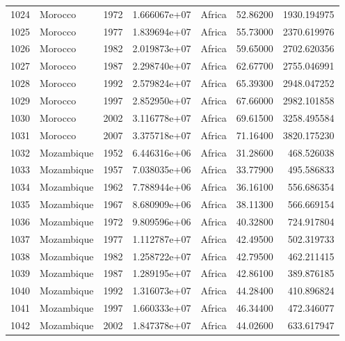 \documentclass[
  letterpaper,
  DIV=11,
  numbers=noendperiod]{scrreprt}
\begin{document}
\begin{tabular}{llrrlrr}
1024 &                   Morocco &  1972 &  1.666067e+07 &    Africa &  52.86200 &    1930.194975 \\
1025 &                   Morocco &  1977 &  1.839694e+07 &    Africa &  55.73000 &    2370.619976 \\
1026 &                   Morocco &  1982 &  2.019873e+07 &    Africa &  59.65000 &    2702.620356 \\
1027 &                   Morocco &  1987 &  2.298740e+07 &    Africa &  62.67700 &    2755.046991 \\
1028 &                   Morocco &  1992 &  2.579824e+07 &    Africa &  65.39300 &    2948.047252 \\
1029 &                   Morocco &  1997 &  2.852950e+07 &    Africa &  67.66000 &    2982.101858 \\
1030 &                   Morocco &  2002 &  3.116778e+07 &    Africa &  69.61500 &    3258.495584 \\
1031 &                   Morocco &  2007 &  3.375718e+07 &    Africa &  71.16400 &    3820.175230 \\
1032 &                Mozambique &  1952 &  6.446316e+06 &    Africa &  31.28600 &     468.526038 \\
1033 &                Mozambique &  1957 &  7.038035e+06 &    Africa &  33.77900 &     495.586833 \\
1034 &                Mozambique &  1962 &  7.788944e+06 &    Africa &  36.16100 &     556.686354 \\
1035 &                Mozambique &  1967 &  8.680909e+06 &    Africa &  38.11300 &     566.669154 \\
1036 &                Mozambique &  1972 &  9.809596e+06 &    Africa &  40.32800 &     724.917804 \\
1037 &                Mozambique &  1977 &  1.112787e+07 &    Africa &  42.49500 &     502.319733 \\
1038 &                Mozambique &  1982 &  1.258722e+07 &    Africa &  42.79500 &     462.211415 \\
1039 &                Mozambique &  1987 &  1.289195e+07 &    Africa &  42.86100 &     389.876185 \\
1040 &                Mozambique &  1992 &  1.316073e+07 &    Africa &  44.28400 &     410.896824 \\
1041 &                Mozambique &  1997 &  1.660333e+07 &    Africa &  46.34400 &     472.346077 \\
1042 &                Mozambique &  2002 &  1.847378e+07 &    Africa &  44.02600 &     633.617947 \\

\end{tabular}
\end{document}
